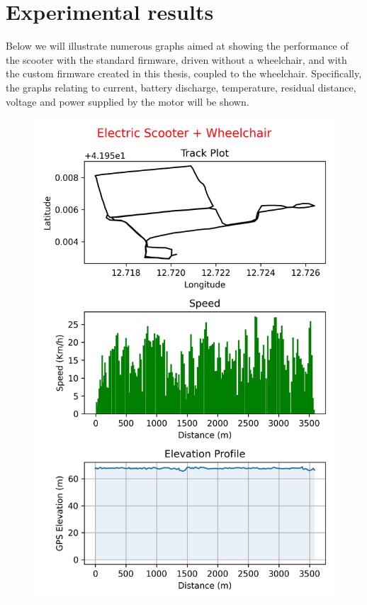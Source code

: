 \documentclass[binding=0.6cm,LaM,noexaminfo]{sapthesis}
\begin{document}
\section{Experimental results}
Below we will illustrate numerous graphs aimed at showing the performance of the scooter with the standard firmware, driven without a wheelchair, and with the custom firmware created in this thesis, coupled to the wheelchair. Specifically, the graphs relating to current, battery discharge, temperature, residual distance, voltage and power supplied by the motor will be shown.

\begin{figure}[!htp]
\centering
    \begin{minipage}[t]{.45\textwidth}
    \centering\includegraphics[width=.87\textwidth]{images/graphs/gpx1.png}
    \end{minipage}
    \begin{minipage}[t]{.45\textwidth}

\end{minipage}
\end{figure}
\end{document}
